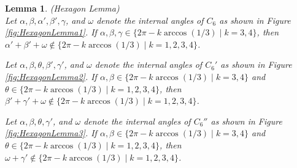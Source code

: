 \documentclass[10pt]{article}
\newtheorem{Lemma}{Lemma}
\numberwithin{Subcase}{Case}
\begin{document}
\begin{Lemma}(Hexagon Lemma) \\
Let $\alpha,\beta,\alpha',\beta',\gamma$, and $\omega$ denote the internal angles of $C_6$ as shown in Figure \ref{fig:HexagonLemma1}. If $\alpha, \beta, \gamma \in \{2\pi-k\arccos(1/3) \; | \; k=3,4\}$, then $\alpha' + \beta' + \omega \notin \{2\pi - k\arccos(1/3) \; | \; k=1,2,3,4\}$.

Let $\alpha, \beta, \theta, \beta', \gamma'$, and $\omega$ denote the internal angles of $C_6'$ as shown in Figure \ref{fig:HexagonLemma2}. If $\alpha, \beta \in \{2\pi-k\arccos(1/3) \; | \; k=3,4\}$ and $\theta \in \{2\pi-k\arccos(1/3) \; | \; k=1,2,3,4\}$, then $\beta' + \gamma' + \omega \notin \{2\pi - k\arccos(1/3) \; | \; k=1,2,3,4\}$.

Let $\alpha, \beta, \theta, \gamma'$, and $\omega$ denote the internal angles of $C_6''$ as shown in Figure \ref{fig:HexagonLemma3}. If $\alpha, \beta \in \{2\pi-k\arccos(1/3) \; | \; k=3,4\}$ and $\theta \in \{2\pi-k\arccos(1/3) \; | \; k=1,2,3,4\}$, then $\omega + \gamma' \notin \{2\pi-k\arccos(1/3) \; | \; k=1,2,3,4\}$.
\end{Lemma}
\end{document}
